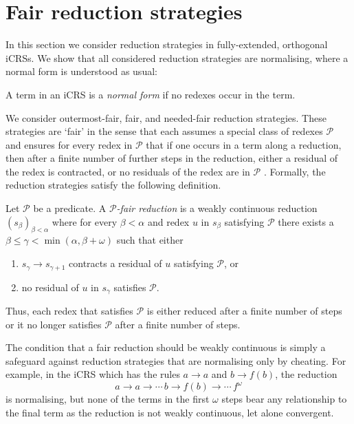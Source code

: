 \documentclass{LMCS}
\theoremstyle{definition}
\newcommand{\rew}{\rightarrow}
\begin{document}
\section{Fair reduction strategies}
\label{sec:normal}

In this section we consider reduction strategies in fully-extended, orthogonal iCRSs. We show that all considered reduction strategies are normalising, where a normal form is understood as usual:
\begin{defi}
A term in an iCRS is a \emph{normal form} if no redexes occur in the term.
\end{defi}


We consider outermost-fair, fair, and needed-fair reduction strategies. These strategies are `fair' in the sense that each assumes a special class of redexes $\mathcal{P}$ and ensures for every redex in $\mathcal{P}$ that if one occurs in a term along a reduction, then after a finite number of further steps in the reduction, either a residual of the redex is contracted, or no residuals of the redex are in $\mathcal{P}$ . Formally, the reduction strategies satisfy the following definition.
\begin{defi}
\label{def:pfair}
Let $\mathcal{P}$ be a predicate. A \emph{$\mathcal{P}$-fair reduction} is a weakly continuous reduction $(s_\beta)_{\beta < \alpha}$ where for every $\beta < \alpha$ and redex $u$ in $s_\beta$ satisfying $\mathcal{P}$ there exists a $\beta \leq \gamma < \min ( \alpha, \beta + \omega )$ such that either
\begin{enumerate}[(1)]
\item
$s_\gamma \rew s_{\gamma + 1}$ contracts a residual of $u$ satisfying $\mathcal{P}$, or
\item
no residual of $u$ in $s_\gamma$ satisfies $\mathcal{P}$.
\end{enumerate}
\end{defi}

Thus, each redex that satisfies $\mathcal{P}$ is either reduced after a finite number of steps or it no longer satisfies $\mathcal{P}$ after a finite number of steps.

\begin{rem}
The condition that a fair reduction should be weakly continuous is simply a safeguard against reduction strategies that are normalising only by cheating. For example, in the iCRS which has the rules $a \rew a$ and $b \rew f(b)$, the reduction
\[
a \rew a \rew \cdots \, b \rew f(b) \rew \cdots \, f^\omega
\]
is normalising, but none of the terms in the first $\omega$ steps bear any relationship to the final term as the reduction is not weakly continuous, let alone convergent.
\end{rem}
\end{document}
